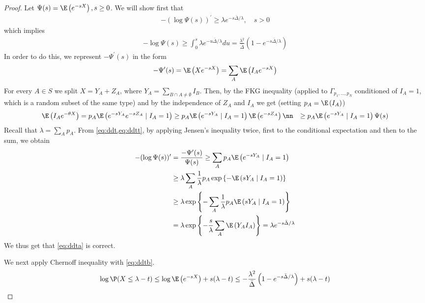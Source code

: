 \documentclass{article}
\begin{document}
\begin{proof}
Let $\Psi(s)= \E\left(e^{-s X}\right), s \geq 0$. We will show first that
\begin{align}
    -(\log \Psi(s))^{\prime} \geq \lambda e^{-s \bar{\Delta} / \lambda}, \quad s>0\label{eq:ddta}
\end{align}
which implies
\begin{align}
    -\log \Psi(s) \geq \int_{0}^{s} \lambda e^{-u \bar{\Delta} / \lambda} d u=\frac{\lambda^{2}}{\bar{\Delta}}\left(1-e^{-s \bar{\Delta} / \lambda}\right)\label{eq:ddtb}
\end{align}
In order to do this, we represent $-\Psi^{\prime}(s)$ in the form
\begin{align}
    -\Psi^{\prime}(s)= \E\left(X e^{-s X}\right)=\sum_{A} \E\left(I_{A} e^{-s X}\right)\label{eq:ddt}
\end{align}
For every $A \in S$ we split $X=Y_{A}+Z_{A}$, where $Y_{A}=\sum_{B \cap A \neq \emptyset} I_{B} .$ Then, by the FKG inequality (applied to $\Gamma_{p_{1}, \ldots, p_{N}}$ conditioned of $I_{A}=1$, which is a random subset of the same type) and by the independence of $Z_{A}$ and $I_{A}$ we get (setting $p_{A}= \E\left(I_{A}\right)$)
\begin{align}
\E\left(I_{A} e^{-\theta X}\right) &=p_{A} \E\left(e^{-s Y_{A}} e^{-s Z_{A}} \mid I_{A}=1\right) \geq p_{A} \E\left(e^{-s Y_{A}} \mid I_{A}=1\right) \E\left(e^{-s Z_{A}}\right) \nn
& \geq p_{A} \E\left(e^{-s Y_{A}} \mid I_{A}=1\right) \Psi(s) \label{eq:ddtt}
\end{align}
Recall that $\lambda=\sum_{A} p_{A}$. From \cref{eq:ddt,eq:ddtt}, by applying Jensen's inequality twice, first to the conditional expectation and then to the sum, we obtain
$$
\begin{aligned}
-(\log \Psi(s))^{\prime} &=\frac{-\Psi^{\prime}(s)}{\Psi(s)} \geq \sum_{A} p_{A} \E\left(e^{-s Y_{A}} \mid I_{A}=1\right) \\
& \geq \lambda \sum_{A} \frac{1}{\lambda} p_{A} \exp \left\{- \E\left(s Y_{A} \mid I_{A}=1\right)\right\} \\
& \geq \lambda \exp \left\{-\sum_{A} \frac{1}{\lambda} p_{A} \E\left(s Y_{A} \mid I_{A}=1\right)\right\} \\
&=\lambda \exp \left\{-\frac{s}{\lambda} \sum_{A} \E \left(Y_{A} I_{A}\right)\right\}=\lambda e^{-s \bar{\Delta} / \lambda}
\end{aligned}
$$
We thus get that \cref{eq:ddta} is correct. 

We next apply Chernoff inequality with \cref{eq:ddtb}.
\begin{align*}
\log \P (X \leq \lambda-t) \leq \log \E \left(e^{-s X}\right)+s(\lambda-t) \leq-\frac{\lambda^{2}}{\bar{\Delta}}\left(1-e^{-s \bar{\Delta} / \lambda}\right)+s(\lambda-t)
\end{align*}
\end{proof} 
\end{document}

